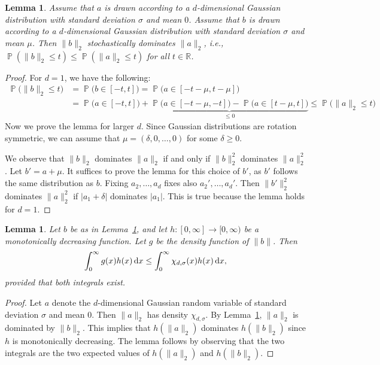 \documentclass[11pt,DIV=12,a4paper]{scrartcl}
\newtheorem{lemma}[claim]{Lemma}
\newcommand{\real}{\ensuremath{\mathbb{R}}}
\DeclareMathOperator{\probab}{\mathbb{P}}
\begin{document}
\begin{lemma}
\label{lem:gaussdom}
Assume that $a$ is drawn according to a $d$-dimensional Gaussian distribution with standard deviation $\sigma$ and mean $0$.
Assume that $b$ is drawn according to a $d$-dimensional Gaussian distribution with standard deviation $\sigma$ and mean $\mu$.
Then $\|b\|_2$ stochastically dominates $\|a\|_2$, i.e.,
$\probab(\|b\|_2 \leq t) \leq \probab(\|a\|_2 \leq t)$ for all $t \in \real$.
\end{lemma}



\begin{proof}
For $d=1$, we have the following:
\begin{align*}
 \probab\bigl(\|b\|_2 \leq t\bigr) & = \probab\bigl(b \in [-t,t]\bigr) 
 = \probab\bigl(a \in [-t-\mu, t-\mu]\bigr) \\
 & = \probab\bigl(a \in [-t, t]) + \underbrace{\probab\bigl(a \in [-t-\mu, -t]\bigr) - \probab\bigl(a \in [t-\mu, t]\bigr)}_{\leq 0}
  \leq \probab\bigl(\|a \|_2 \leq t\bigr)
\end{align*}
Now we prove the lemma for larger $d$. Since Gaussian distributions are rotation symmetric,
we can assume that $\mu = (\delta, 0, \ldots, 0)$ for some $\delta \geq 0$.

We observe that $\|b\|_2$ dominates $\|a\|_2$ if and only if
$\|b\|_2^2$ dominates $\|a\|_2^2$. Let $b' = a + \mu$. It suffices to prove the lemma for this choice of $b'$, as $b'$ follows the same distribution as $b$.
Fixing $a_2, \ldots, a_d$ fixes also $a_2', \ldots, a_d'$.
Then $\|b'\|_2^2$ dominates $\|a\|_2^2$ if $|a_1 + \delta|$ dominates $|a_1|$. This is true because
the lemma holds for $d=1$.
\end{proof}

\begin{lemma}
\label{lem:replacechi}
Let $b$ be as in Lemma~\ref{lem:gaussdom}, and let $h: [0, \infty] \to [0,\infty)$ be a monotonically decreasing function.
Let $g$ be the density function of $\|b\|$.
Then
\[
 \int_{0}^\infty g(x) h(x) \, \textup d x \leq \int_{0}^\infty \chi_{d, \sigma}(x) h(x) \, \textup d x,
\]
provided that both integrals exist.
\end{lemma}

\begin{proof}
Let $a$ denote the $d$-dimensional Gaussian random variable of standard deviation $\sigma$ and mean $0$.
Then $\|a\|_2$ has density $\chi_{d, \sigma}$.
By Lemma~\ref{lem:gaussdom}, $\|a\|_2$ is dominated by $\|b\|_2$. This implies that
$h(\|a\|_2)$ dominates $h(\|b\|_2)$ since $h$ is monotonically decreasing.
The lemma follows by observing that the two integrals are the two expected values of
$h(\|a\|_2)$ and $h(\|b\|_2)$.
\end{proof}
\end{document}
